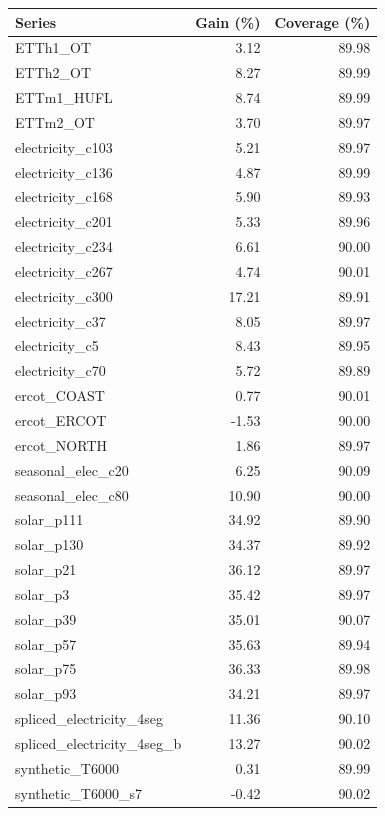 \begin{tabular}{lrr}
\toprule
Series & Gain (\%) & Coverage (\%) \\
\midrule
ETTh1\_OT & 3.12 & 89.98 \\
ETTh2\_OT & 8.27 & 89.99 \\
ETTm1\_HUFL & 8.74 & 89.99 \\
ETTm2\_OT & 3.70 & 89.97 \\
electricity\_c103 & 5.21 & 89.97 \\
electricity\_c136 & 4.87 & 89.99 \\
electricity\_c168 & 5.90 & 89.93 \\
electricity\_c201 & 5.33 & 89.96 \\
electricity\_c234 & 6.61 & 90.00 \\
electricity\_c267 & 4.74 & 90.01 \\
electricity\_c300 & 17.21 & 89.91 \\
electricity\_c37 & 8.05 & 89.97 \\
electricity\_c5 & 8.43 & 89.95 \\
electricity\_c70 & 5.72 & 89.89 \\
ercot\_COAST & 0.77 & 90.01 \\
ercot\_ERCOT & -1.53 & 90.00 \\
ercot\_NORTH & 1.86 & 89.97 \\
seasonal\_elec\_c20 & 6.25 & 90.09 \\
seasonal\_elec\_c80 & 10.90 & 90.00 \\
solar\_p111 & 34.92 & 89.90 \\
solar\_p130 & 34.37 & 89.92 \\
solar\_p21 & 36.12 & 89.97 \\
solar\_p3 & 35.42 & 89.97 \\
solar\_p39 & 35.01 & 90.07 \\
solar\_p57 & 35.63 & 89.94 \\
solar\_p75 & 36.33 & 89.98 \\
solar\_p93 & 34.21 & 89.97 \\
spliced\_electricity\_4seg & 11.36 & 90.10 \\
spliced\_electricity\_4seg\_b & 13.27 & 90.02 \\
synthetic\_T6000 & 0.31 & 89.99 \\
synthetic\_T6000\_s7 & -0.42 & 90.02 \\
\bottomrule
\end{tabular}